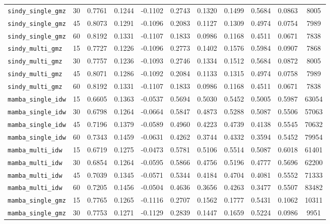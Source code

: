 \documentclass[12pt, a4paper]{article}
\begin{document}
{\begin{longtable}{p{4.0cm}cccccccccc}
\texttt{sindy\_single\_gmz} & 30 & 0.7761 & 0.1244 & -0.1102 & 0.2743 & 0.1320 & 0.1499 & 0.5684 & 0.0863 & 8005 \\
\texttt{sindy\_single\_gmz} & 45 & 0.8073 & 0.1291 & -0.1096 & 0.2083 & 0.1127 & 0.1309 & 0.4974 & 0.0754 & 7989 \\
\texttt{sindy\_single\_gmz} & 60 & 0.8192 & 0.1331 & -0.1107 & 0.1833 & 0.0986 & 0.1168 & 0.4511 & 0.0671 & 7838 \\
\addlinespace[1pt]
\texttt{sindy\_multi\_gmz} & 15 & 0.7727 & 0.1226 & -0.1096 & 0.2773 & 0.1402 & 0.1576 & 0.5984 & 0.0907 & 7868 \\
\texttt{sindy\_multi\_gmz} & 30 & 0.7757 & 0.1236 & -0.1093 & 0.2746 & 0.1334 & 0.1512 & 0.5684 & 0.0872 & 8005 \\
\texttt{sindy\_multi\_gmz} & 45 & 0.8071 & 0.1286 & -0.1092 & 0.2084 & 0.1133 & 0.1315 & 0.4974 & 0.0758 & 7989 \\
\texttt{sindy\_multi\_gmz} & 60 & 0.8192 & 0.1331 & -0.1107 & 0.1833 & 0.0986 & 0.1168 & 0.4511 & 0.0671 & 7838 \\
\addlinespace[1pt]
\texttt{mamba\_single\_idw} & 15 & 0.6605 & 0.1363 & -0.0537 & 0.5694 & 0.5030 & 0.5452 & 0.5005 & 0.5987 & 63054 \\
\texttt{mamba\_single\_idw} & 30 & 0.6798 & 0.1264 & -0.0664 & 0.5847 & 0.4873 & 0.5288 & 0.5087 & 0.5506 & 57063 \\
\texttt{mamba\_single\_idw} & 45 & 0.7196 & 0.1379 & -0.0589 & 0.4960 & 0.4223 & 0.4739 & 0.4138 & 0.5545 & 70632 \\
\texttt{mamba\_single\_idw} & 60 & 0.7343 & 0.1459 & -0.0631 & 0.4262 & 0.3744 & 0.4332 & 0.3594 & 0.5452 & 79954 \\
\addlinespace[1pt]
\texttt{mamba\_multi\_idw} & 15 & 0.6719 & 0.1275 & -0.0473 & 0.5781 & 0.5106 & 0.5514 & 0.5087 & 0.6018 & 61401 \\
\texttt{mamba\_multi\_idw} & 30 & 0.6854 & 0.1264 & -0.0595 & 0.5866 & 0.4756 & 0.5196 & 0.4777 & 0.5696 & 62200 \\
\texttt{mamba\_multi\_idw} & 45 & 0.7039 & 0.1345 & -0.0571 & 0.5344 & 0.4184 & 0.4704 & 0.4081 & 0.5552 & 71333 \\
\texttt{mamba\_multi\_idw} & 60 & 0.7205 & 0.1456 & -0.0504 & 0.4636 & 0.3656 & 0.4263 & 0.3477 & 0.5507 & 83482 \\
\addlinespace[1pt]
\texttt{mamba\_single\_gmz} & 15 & 0.7765 & 0.1265 & -0.1116 & 0.2707 & 0.1562 & 0.1777 & 0.5431 & 0.1062 & 10311 \\
\texttt{mamba\_single\_gmz} & 30 & 0.7753 & 0.1271 & -0.1129 & 0.2839 & 0.1447 & 0.1659 & 0.5224 & 0.0986 & 9951 \\

\end{longtable}}
\end{document}
